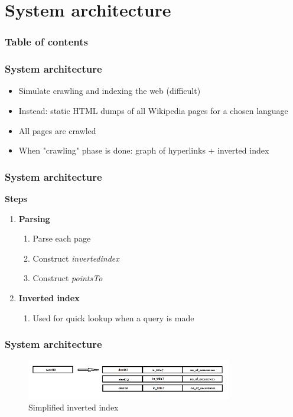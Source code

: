 \documentclass[10pt]{beamer}
\begin{document}
\section{System architecture}

\begin{frame}
  \frametitle{Table of contents}
  \tableofcontents[currentsection]
\end{frame}

\begin{frame}
  \frametitle{System architecture}
  \begin{itemize}
    \item Simulate crawling and indexing the web (difficult)
    \item Instead: static HTML dumps of all Wikipedia pages for a chosen language
    \item All pages are crawled
    \item When "crawling" phase is done: graph of hyperlinks + inverted index
  \end{itemize}
\end{frame}

\begin{frame}
  \frametitle{System architecture}
  \textbf{Steps}
  \begin{enumerate}
    \item \textbf{Parsing}
      \begin{enumerate}
        \item Parse each page
        \item Construct \emph{invertedindex}
        \item Construct \emph{pointsTo}
      \end{enumerate}
    \item \textbf{Inverted index}
      \begin{enumerate}
        \item Used for quick lookup when a query is made
      \end{enumerate}
  \end{enumerate}
\end{frame}

\begin{frame}
  \frametitle{System architecture}
  \begin{figure}[h]
    \includegraphics[width=0.8\textwidth]{index.png}
    \caption{Simplified inverted index}
  \end{figure}
\end{frame}
\end{document}
